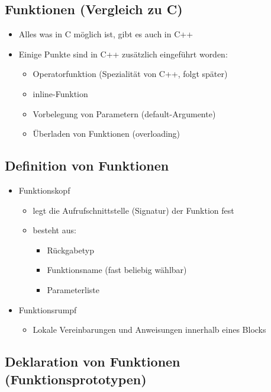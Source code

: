 \subsection{Funktionen (Vergleich zu C)}
\label{sec:Funktionen (Vergleich zu C)}
\begin{itemize}
	\item Alles was in C möglich ist, gibt es auch in C++
	\item Einige Punkte sind in C++ zusätzlich eingeführt worden:
	\begin{itemize}
		\item Operatorfunktion (Spezialität von C++, folgt später)
		\item inline-Funktion
		\item Vorbelegung von Parametern (default-Argumente)
		\item Überladen von Funktionen (overloading)
	\end{itemize}
\end{itemize}

\subsection{Definition von Funktionen}
\label{sec:Definition von Funktionen}
\begin{itemize}
	\item Funktionskopf
	\begin{itemize}
		\item legt die Aufrufschnittstelle (Signatur) der Funktion fest
		\item besteht aus:
		\begin{itemize}
			\item Rückgabetyp
			\item Funktionsname (fast beliebig wählbar)
			\item Parameterliste
		\end{itemize}
	\end{itemize}
	\item Funktionsrumpf
	\begin{itemize}
		\item Lokale Vereinbarungen und Anweisungen innerhalb eines Blocks
	\end{itemize}
\end{itemize}

\subsection{Deklaration von Funktionen (Funktionsprototypen)}
\label{sec:Deklaration von Funktionen}


